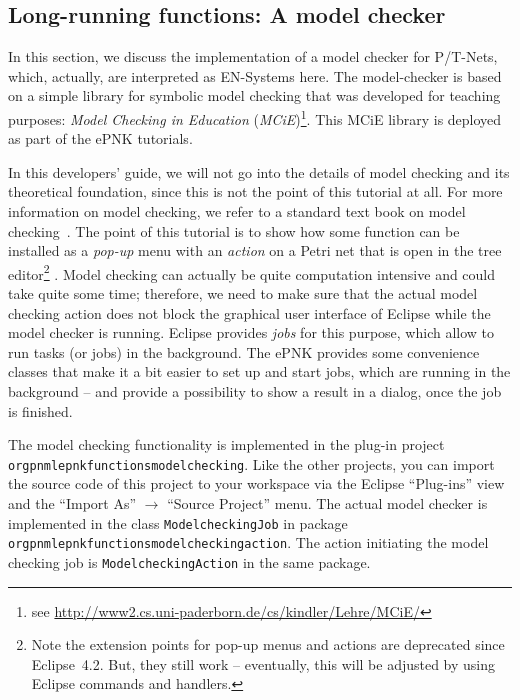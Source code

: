 \subsection{Long-running functions: A model checker}
\label{subsec:tutorial-MC}

In this section, we discuss the implementation of a model checker for P/T-Nets,
which, actually, are interpreted as EN-Systems here. The model-checker is based
on a simple library for symbolic model checking that was developed for
teaching purposes: \emph{Model Checking in Education} (\emph{MCiE})\footnote{
see \url{http://www2.cs.uni-paderborn.de/cs/kindler/Lehre/MCiE/}}. This MCiE
library is deployed as part of the ePNK tutorials.

In this developers' guide, we will not go into the details of model checking
and its theoretical foundation, since this is not the point of this tutorial
at all. For more information on model checking, we refer to a standard text book
on model checking~\cite{CGP99}. The point of this tutorial is to show how some
function can be installed as a \emph{pop-up} menu with an \emph{action} on a
Petri net that is open in the tree editor\footnote
  {Note the extension points for pop-up menus and actions are deprecated
   since Eclipse~4.2. But, they still work -- eventually, this will be adjusted
   by using Eclipse commands and handlers.}%
. Model checking can actually be quite computation intensive and
could take quite some time; therefore, we need to make sure that the actual
model checking action does not block the graphical user interface of Eclipse
while the model checker is running. Eclipse provides \emph{jobs} for this
purpose, which allow to run tasks (or jobs) in the background.
The ePNK provides some convenience classes that make it a bit easier to set up
and start jobs, which are running in the background -- and provide a possibility
to show a result in a dialog, once the job is finished.

The model checking functionality is implemented in the plug-in project
{\tt org\qnsep{}pnml\qnsep{}epnk\qnsep{}functions\qnsep{}modelchecking}. Like the other projects,
you can import the source code of this project to your workspace via
the Eclipse ``Plug-ins'' view and the ``Import As'' $\rightarrow$ ``Source
Project'' menu. The actual model checker is implemented in
the class {\tt ModelcheckingJob} in package
{\tt org\qnsep{}pnml\qnsep{}epnk\qnsep{}functions\qnsep{}modelchecking\qnsep{}action}.
The action initiating the model checking job is
{\tt Modelchecking\optsep{}Action} in the same package.

